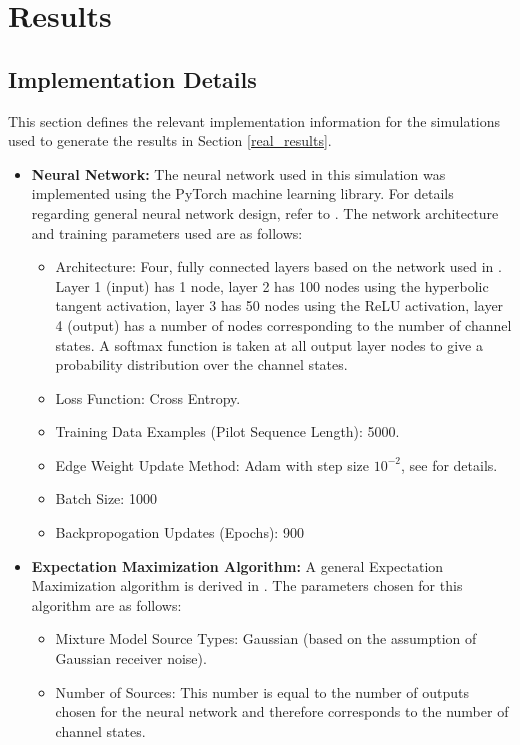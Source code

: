 \section{Results}

\subsection{Implementation Details}\label{implementation_details}
This section defines the relevant implementation information for the simulations used to generate the results in Section \ref{real_results}.

\begin{itemize}
\item \textbf{Neural Network:}
The neural network used in this simulation was implemented using the PyTorch machine learning library. For details regarding general neural network design, refer to \cite{Goodfellow-et-al-2016}. The network architecture and training parameters used are as follows:
\begin{itemize}
\item Architecture: Four, fully connected layers based on the network used in  \cite{shlezinger2019viterbinet}. Layer 1 (input) has 1 node, layer 2 has 100 nodes using the hyperbolic tangent activation, layer 3 has 50 nodes using the ReLU activation, layer 4 (output) has a number of nodes corresponding to the number of channel states. A softmax function is taken at all output layer nodes to give a probability distribution over the channel states. 
\item Loss Function: Cross Entropy.
\item Training Data Examples (Pilot Sequence Length): 5000.
\item Edge Weight Update Method: Adam with step size $10^{-2}$, see \cite{kingma2014adam} for details.
\item Batch Size: 1000 
\item Backpropogation Updates (Epochs): 900
\end{itemize}
\item \textbf{Expectation Maximization Algorithm:} A general Expectation Maximization algorithm is derived in \cite{ng2000cs229}. The parameters chosen for this algorithm are as follows:
\begin{itemize}
\item Mixture Model Source Types: Gaussian (based on the assumption of Gaussian receiver noise).
\item Number of Sources: This number is equal to the number of outputs chosen for the neural network and therefore corresponds to the number of channel states.

\end{itemize}
\end{itemize}
